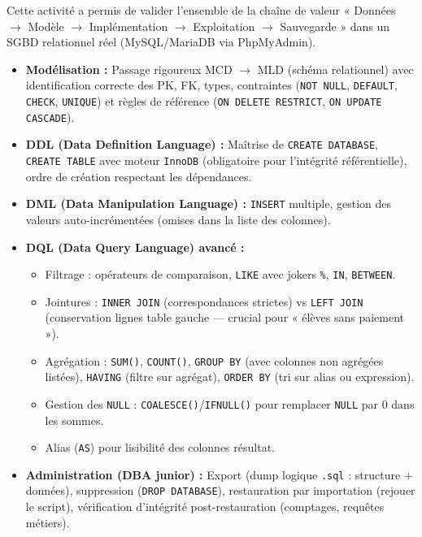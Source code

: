 \documentclass[11pt]{article}
\newcommand{\cle}[1]{{\popxbold\color{popdark}#1}}
\newcounter{popsec}
\newcounter{popsub}
\newcommand{\courssub}[1]{%
  \stepcounter{popsub}%
  \par\vspace{9pt}\noindent{\popxbold\fontsize{11.5}{13}\selectfont\color{popink}{\color{poporange}\thepopsec.\thepopsub}\hspace{6pt}#1}\par\nopagebreak\vspace{4pt}
}
\begin{document}
\courssub{Bilan de l'activité}
Cette activité a permis de valider l'ensemble de la chaîne de valeur « Données $\to$ Modèle $\to$ Implémentation $\to$ Exploitation $\to$ Sauvegarde » dans un SGBD relationnel réel (MySQL/MariaDB via PhpMyAdmin).

\begin{aretenir}
\begin{itemize}
    \item \textbf{Modélisation :} Passage rigoureux \cle{MCD} $\to$ \cle{MLD} (schéma relationnel) avec identification correcte des \cle{PK}, \cle{FK}, types, contraintes (\texttt{NOT NULL}, \texttt{DEFAULT}, \texttt{CHECK}, \texttt{UNIQUE}) et règles de référence (\texttt{ON DELETE RESTRICT}, \texttt{ON UPDATE CASCADE}).
    \item \textbf{DDL (Data Definition Language) :} Maîtrise de \texttt{CREATE DATABASE}, \texttt{CREATE TABLE} avec moteur \texttt{InnoDB} (obligatoire pour l'intégrité référentielle), ordre de création respectant les dépendances.
    \item \textbf{DML (Data Manipulation Language) :} \texttt{INSERT} multiple, gestion des valeurs auto-incrémentées (omises dans la liste des colonnes).
    \item \textbf{DQL (Data Query Language) avancé :}
        \begin{itemize}
            \item Filtrage : opérateurs de comparaison, \texttt{LIKE} avec jokers \texttt{\%}, \texttt{IN}, \texttt{BETWEEN}.
            \item Jointures : \texttt{INNER JOIN} (correspondances strictes) vs \texttt{LEFT JOIN} (conservation lignes table gauche — crucial pour « élèves sans paiement »).
            \item Agrégation : \texttt{SUM()}, \texttt{COUNT()}, \texttt{GROUP BY} (avec colonnes non agrégées listées), \texttt{HAVING} (filtre sur agrégat), \texttt{ORDER BY} (tri sur alias ou expression).
            \item Gestion des \texttt{NULL} : \texttt{COALESCE()}/\texttt{IFNULL()} pour remplacer \texttt{NULL} par 0 dans les sommes.
            \item Alias (\texttt{AS}) pour lisibilité des colonnes résultat.
        \end{itemize}
    \item \textbf{Administration (DBA junior) :} Export (dump logique \texttt{.sql} : structure + données), suppression (\texttt{DROP DATABASE}), restauration par importation (rejouer le script), vérification d'intégrité post-restauration (comptages, requêtes métiers).
\end{itemize}
\end{aretenir}
\end{document}
